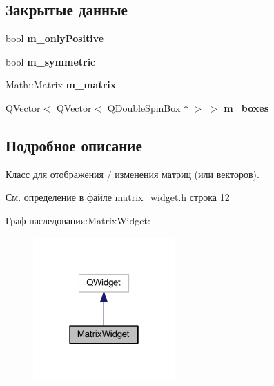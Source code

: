 \subsection*{Закрытые данные}
\begin{DoxyCompactItemize}
\item 
\hypertarget{class_matrix_widget_a82f2f645dfe6a61844cbcaa7b9d74c5f}{}\label{class_matrix_widget_a82f2f645dfe6a61844cbcaa7b9d74c5f} 
bool {\bfseries m\+\_\+only\+Positive}
\item 
\hypertarget{class_matrix_widget_ad3c5c9a7eb76b52d92ff88e5aac69df8}{}\label{class_matrix_widget_ad3c5c9a7eb76b52d92ff88e5aac69df8} 
bool {\bfseries m\+\_\+symmetric}
\item 
\hypertarget{class_matrix_widget_a45e4733316b0de574c8f333e3f89bd4c}{}\label{class_matrix_widget_a45e4733316b0de574c8f333e3f89bd4c} 
Math\+::\+Matrix {\bfseries m\+\_\+matrix}
\item 
\hypertarget{class_matrix_widget_ab3a0c3c5c847e0a35aa23a6a7e7d56f6}{}\label{class_matrix_widget_ab3a0c3c5c847e0a35aa23a6a7e7d56f6} 
Q\+Vector$<$ Q\+Vector$<$ Q\+Double\+Spin\+Box $\ast$ $>$ $>$ {\bfseries m\+\_\+boxes}
\end{DoxyCompactItemize}


\subsection{Подробное описание}
Класс для отображения / изменения матриц (или векторов). 

См. определение в файле matrix\+\_\+widget.\+h строка 12



Граф наследования\+:Matrix\+Widget\+:\nopagebreak
\begin{figure}[H]
\begin{center}
\leavevmode
\includegraphics[width=154pt]{class_matrix_widget__inherit__graph}
\end{center}
\end{figure}


